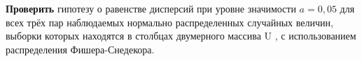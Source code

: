 \textbf{Проверить} гипотезу о равенстве дисперсий при уровне значимости $a=0,05$
для всех трёх пар наблюдаемых нормально распределенных случайных
величин, выборки которых находятся в столбцах двумерного массива U , с
использованием распределения Фишера-Снедекора.



